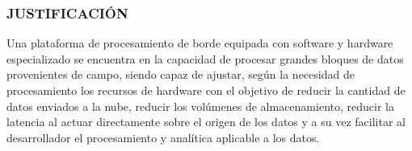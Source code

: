 \documentclass{beamer}
\begin{document}
\begin{frame}
\frametitle{JUSTIFICACIÓN}

Una plataforma de procesamiento de borde equipada con software y hardware especializado \iffalse como el propuesto en este proyecto \fi se encuentra en la capacidad de procesar grandes bloques de datos provenientes de campo, siendo capaz de ajustar, según la necesidad de procesamiento los recursos de hardware con el objetivo de reducir la cantidad de datos enviados a la nube, reducir los volúmenes de almacenamiento, reducir la latencia al actuar directamente sobre el origen de los datos y a su vez facilitar al desarrollador el procesamiento y analítica aplicable a los datos.

\end{frame}

\end{document}
